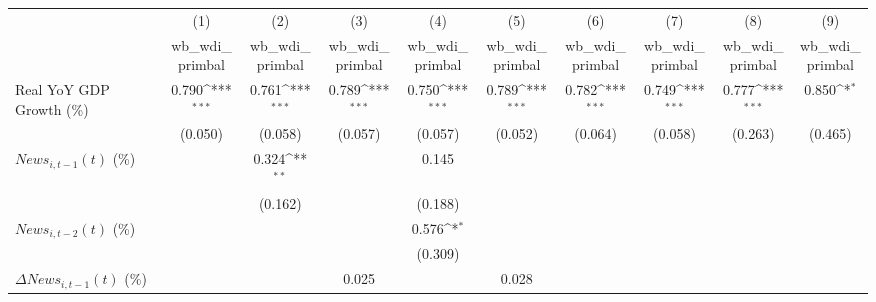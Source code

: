 {
\def\sym#1{\ifmmode^{#1}\else\(^{#1}\)\fi}
\begin{tabular}{l*{9}{c}}
\toprule
                    &\multicolumn{1}{c}{(1)}&\multicolumn{1}{c}{(2)}&\multicolumn{1}{c}{(3)}&\multicolumn{1}{c}{(4)}&\multicolumn{1}{c}{(5)}&\multicolumn{1}{c}{(6)}&\multicolumn{1}{c}{(7)}&\multicolumn{1}{c}{(8)}&\multicolumn{1}{c}{(9)}\\
                    &\multicolumn{1}{c}{wb_wdi_primbal}&\multicolumn{1}{c}{wb_wdi_primbal}&\multicolumn{1}{c}{wb_wdi_primbal}&\multicolumn{1}{c}{wb_wdi_primbal}&\multicolumn{1}{c}{wb_wdi_primbal}&\multicolumn{1}{c}{wb_wdi_primbal}&\multicolumn{1}{c}{wb_wdi_primbal}&\multicolumn{1}{c}{wb_wdi_primbal}&\multicolumn{1}{c}{wb_wdi_primbal}\\
\midrule
Real YoY GDP Growth (\%)&       0.790\sym{***}&       0.761\sym{***}&       0.789\sym{***}&       0.750\sym{***}&       0.789\sym{***}&       0.782\sym{***}&       0.749\sym{***}&       0.777\sym{***}&       0.850\sym{*}  \\
                    &     (0.050)         &     (0.058)         &     (0.057)         &     (0.057)         &     (0.052)         &     (0.064)         &     (0.058)         &     (0.263)         &     (0.465)         \\
\addlinespace
$ News_{i,t-1}(t)$ (\%)&                     &       0.324\sym{**} &                     &       0.145         &                     &                     &                     &                     &                     \\
                    &                     &     (0.162)         &                     &     (0.188)         &                     &                     &                     &                     &                     \\
\addlinespace
$ News_{i,t-2}(t)$ (\%)&                     &                     &                     &       0.576\sym{*}  &                     &                     &                     &                     &                     \\
                    &                     &                     &                     &     (0.309)         &                     &                     &                     &                     &                     \\
\addlinespace
$ \Delta News_{i,t-1}(t)$ (\%)&                     &                     &       0.025         &                     &       0.028         &                     &                     &                     &                     \\

\end{tabular}}
